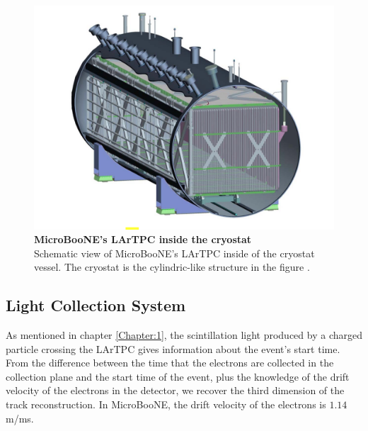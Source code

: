 \begin{figure}[h!]
    \begin{center}
        \includegraphics[scale=0.35]{Figures/uboone_cryo.png}
        \caption[MicroBooNE's LArTPC inside the cryostat]{{\textbf{MicroBooNE's LArTPC inside the cryostat}} \\ Schematic view of MicroBooNE's LArTPC inside of the cryostat vessel. The cryostat is the cylindric-like structure in the figure \cite{microboone_design}.}
        \label{uboone_cryo} 
    \end{center}
\end{figure}

\subsection{Light Collection System}

As mentioned in chapter \ref{Chapter:1}, the scintillation light produced by a charged particle crossing the LArTPC gives information about the event's start time. From the difference between the time that the electrons are collected in the collection plane and the start time of the event, plus the knowledge of the drift velocity of the electrons in the detector, we recover the third dimension of the track reconstruction. In MicroBooNE, the drift velocity of the electrons is $1.14$ m/ms. 

